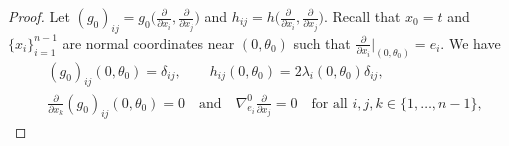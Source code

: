 \documentclass[10pt]{amsart}
\theoremstyle{definition}
\renewcommand{\>}{{\rangle}}
\newcommand{\<}{{\langle}}
\begin{document}
\begin{proof}
Let $(g_0)_{ij}=g_0\bigl(\frac{\partial}{\partial x_i},\frac{\partial}{\partial x_j}\bigr)$ and $h_{ij}=h\bigl(\frac{\partial}{\partial x_i},\frac{\partial}{\partial x_j}\bigr)$. Recall that $x_0=t$ and $\{x_i\}_{i=1}^{n-1}$ are normal coordinates near $(0,\theta_0)$ such that $\frac{\partial}{\partial x_i}|_{(0,\theta_0)}=e_i$. We have
\begin{equation}\label{eq: normal_coordinates_negative}
\begin{aligned}
&(g_0)_{ij}(0,\theta_0)=\delta_{ij}, \qquad h_{ij}(0,\theta_0) = 2\lambda_i(0,\theta_0)\delta_{ij},\\
&\frac{\partial}{\partial x_k}(g_0)_{ij}(0,\theta_0)=0 \quad \text{and} \quad \nabla^0_{e_i}\frac{\partial}{\partial x_j}=0 \quad\text{for all } i,j,k\in\{1,\ldots,n-1\},
\end{aligned}
\end{equation}


\end{proof}
\end{document}
